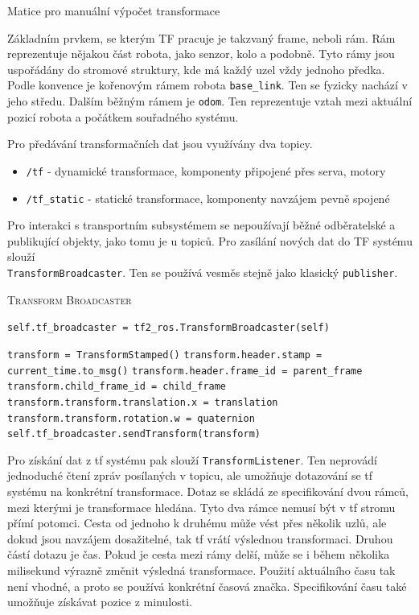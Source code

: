 \begin{center}
	Matice pro manuální výpočet transformace
\end{center}

Základním prvkem, se kterým TF pracuje je takzvaný frame, neboli rám. Rám reprezentuje nějakou část robota, jako senzor, kolo a podobně. Tyto rámy jsou uspořádány do stromové struktury, kde má každý uzel vždy jednoho předka. Podle konvence je kořenovým rámem robota \verb|base_link|. Ten se fyzicky nachází v jeho středu. Dalším běžným rámem je \verb|odom|. Ten reprezentuje vztah mezi aktuální pozicí robota a počátkem souřadného systému.~\cite{ros_reps}

Pro předávání transformačních dat jsou využívány dva topicy.
\begin{itemize}
	\item {\verb|/tf| - dynamické transformace, komponenty připojené přes serva, motory}
	\item {\verb|/tf_static| - statické transformace, komponenty navzájem pevně spojené}
\end{itemize}
Pro interakci s transportním subsystémem se nepoužívají běžné odběratelské a publikující objekty, jako tomu je u topiců.
Pro zasílání nových dat do TF systému slouží \\ \verb|TransformBroadcaster|. Ten se používá vesměs stejně jako klasický \verb|publisher|.  \cite{ros2_documentation} 

\begin{algorithm}[h!]
	\label{}
	\caption{\textsc{Transform Broadcaster}}
	
	\DontPrintSemicolon
	\SetAlgoNoLine
	\SetNlSty{}{}{:}
	\SetNlSkip{-1.1em}
	
	\BlankLine \Indp\Indpp
	
    \texttt{self.tf\_broadcaster = tf2\_ros.TransformBroadcaster(self)}\;
 
 	\BlankLine
	\texttt{transform = TransformStamped()}\;
	\texttt{transform.header.stamp = current\_time.to\_msg()}\;
	\texttt{transform.header.frame\_id = parent\_frame}\;
	\texttt{transform.child\_frame\_id = child\_frame}\;
	\texttt{transform.transform.translation.x = translation}\;
	\texttt{transform.transform.rotation.w = quaternion}\;
	\texttt{self.tf\_broadcaster.sendTransform(transform)}\;
	
\end{algorithm}

\newpage
Pro získání dat z tf systému pak slouží \verb|TransformListener|. Ten neprovádí jednoduché čtení zpráv posílaných v topicu, ale umožňuje dotazování se tf systému na konkrétní transformace. Dotaz se skládá ze specifikování dvou rámců, mezi kterými je transformace hledána. Tyto dva rámce nemusí být v tf stromu přímí potomci. Cesta od jednoho k druhému může vést přes několik uzlů, ale dokud jsou navzájem dosažitelné, tak tf vrátí výslednou transformaci. Druhou částí dotazu je čas. Pokud je cesta mezi rámy delší, může se i během několika milisekund výrazně změnit výsledná transformace. Použití aktuálního času tak není vhodné, a proto se používá konkrétní časová značka. Specifikování času také umožňuje získávat pozice z minulosti. \cite{ros2_documentation}

